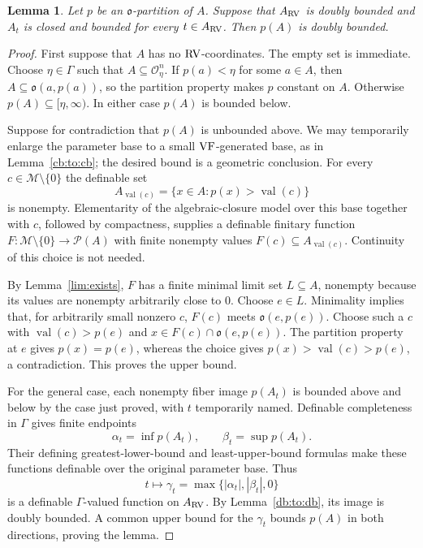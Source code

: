 \documentclass[12pt]{amsart}
\theoremstyle{plain}
\newtheorem{lem}[thm]{Lemma}
\theoremstyle{definition}
\theoremstyle{remark}
\numberwithin{equation}{section}
\theoremstyle{plain}
\newcommand{\VF}{\textup{VF}}
\newcommand{\RV}{\textup{RV}}
\newcommand{\MM}{\mdl M}
\newcommand{\OO}{\mdl O}
\newcommand{\go}{\mathfrak{o}}
\newcommand{\0}{\emptyset}
\newcommand{\mdl}[1]{\mathcal{#1}}  %
\newcommand{\fun}{\longrightarrow}
\newcommand{\efun}{\longmapsto}
\DeclareMathOperator{\vv}{val}
\begin{document}
\begin{lem}\label{vol:par:bounded}
Let $p$ be an $\go$-partition of $A$. Suppose that $A_{\RV}$ is doubly bounded and $A_t$ is closed and bounded for every $t \in A_{\RV}$. Then $p(A)$ is doubly bounded.
\end{lem}
\begin{proof}
First suppose that $A$ has no $\RV$-coordinates. The empty set is immediate. Choose $\eta\in\Gamma$ such that $A\subseteq\OO_\eta^n$. If $p(a)<\eta$ for some $a\in A$, then $A\subseteq\go(a,p(a))$, so the partition property makes $p$ constant on $A$. Otherwise $p(A)\subseteq[\eta,\infty)$. In either case $p(A)$ is bounded below.

Suppose for contradiction that $p(A)$ is unbounded above. We may temporarily enlarge the parameter base to a small $\VF$-generated base, as in Lemma~\ref{cb:to:cb}; the desired bound is a geometric conclusion. For every $c\in\MM\setminus\{0\}$ the definable set
\[
A_{\vv(c)}=\{x\in A:p(x)>\vv(c)\}
\]
is nonempty. Elementarity of the algebraic-closure model over this base together with $c$, followed by compactness, supplies a definable finitary function $F:\MM\setminus\{0\}\fun\mdl P(A)$ with finite nonempty values $F(c)\subseteq A_{\vv(c)}$. Continuity of this choice is not needed.

By Lemma~\ref{lim:exists}, $F$ has a finite minimal limit set $L\subseteq A$, nonempty because its values are nonempty arbitrarily close to $0$. Choose $e\in L$. Minimality implies that, for arbitrarily small nonzero $c$, $F(c)$ meets $\go(e,p(e))$. Choose such a $c$ with $\vv(c)>p(e)$ and $x\in F(c)\cap\go(e,p(e))$. The partition property at $e$ gives $p(x)=p(e)$, whereas the choice gives $p(x)>\vv(c)>p(e)$, a contradiction. This proves the upper bound.

For the general case, each nonempty fiber image $p(A_t)$ is bounded above and below by the case just proved, with $t$ temporarily named. Definable completeness in $\Gamma$ gives finite endpoints
\[
\alpha_t=\inf p(A_t),\qquad \beta_t=\sup p(A_t).
\]
Their defining greatest-lower-bound and least-upper-bound formulas make these functions definable over the original parameter base. Thus
\[
t\efun\gamma_t=\max\{|\alpha_t|,|\beta_t|,0\}
\]
is a definable $\Gamma$-valued function on $A_{\RV}$. By Lemma~\ref{db:to:db}, its image is doubly bounded. A common upper bound for the $\gamma_t$ bounds $p(A)$ in both directions, proving the lemma.
\end{proof}
\end{document}
